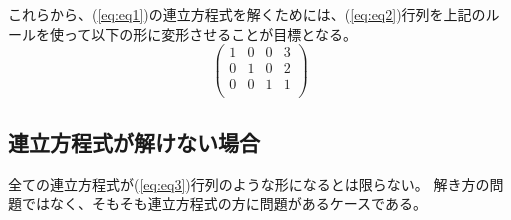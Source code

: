 \documentclass[]{ltjsarticle}%
\begin{document}
これらから、(\ref{eq:eq1})の連立方程式を解くためには、(\ref{eq:eq2})行列を上記のルールを使って以下の形に変形させることが目標となる。
\begin{equation}
  \label{eq:eq3}
  \left(
  \begin{array}{rrr|r}
      1 & 0 & 0 & 3 \\
      0 & 1 & 0 & 2 \\
      0 & 0 & 1 & 1 \\
    \end{array}
  \right)
\end{equation}

\subsection{連立方程式が解けない場合}
全ての連立方程式が(\ref{eq:eq3})行列のような形になるとは限らない。
解き方の問題ではなく、そもそも連立方程式の方に問題があるケースである。
\end{document}
